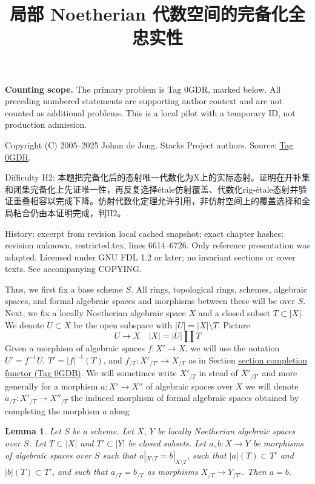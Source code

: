 \documentclass{amsart}
\theoremstyle{plain}
\newtheorem{lemma}[subsection]{Lemma}
\theoremstyle{definition}
\theoremstyle{remark}
\numberwithin{equation}{subsection}
\begin{document}
\title[Stacks Project, Tag 0GDR]{局部 Noetherian 代数空间的完备化全忠实性}
\maketitle
\noindent\textbf{Counting scope.} The primary problem is Tag 0GDR, marked below. All preceding numbered statements are supporting author context and are not counted as additional problems. This is a local pilot with a temporary ID, not production admission.


\noindent Copyright (C) 2005--2025 Johan de Jong. Stacks Project authors. Source: \href{https://stacks.math.columbia.edu/tag/0GDR}{Tag 0GDR}.

\noindent Difficulty H2: 本题把完备化后的态射唯一代数化为X上的实际态射。证明在开补集和闭集完备化上先证唯一性，再反复选择étale仿射覆盖、代数化rig-étale态射并验证重叠相容以完成下降。仿射代数化定理允许引用，非仿射空间上的覆盖选择和全局粘合仍由本证明完成，判H2。.

\noindent History: excerpt from revision local cached snapshot; exact chapter hashes; revision unknown, restricted.tex, lines 6614--6726. Only reference presentation was adapted. Licensed under GNU FDL 1.2 or later; no invariant sections or cover texts. See accompanying COPYING.

\medskip\noindent
Thus, we first fix a base scheme $S$. All rings, topological rings,
schemes, algebraic spaces, and formal algebraic spaces and
morphisms between these will be over $S$. Next, we fix a
locally Noetherian algebraic space $X$ and a closed subset $T \subset |X|$.
We denote $U \subset X$ be the open subspace with $|U| = |X| \setminus T$.
Picture
$$
U \to X \quad |X| = |U| \amalg T
$$
Given a morphism of algebraic spaces $f : X' \to X$, we will use the notation
$U' = f^{-1}U$, $T' = |f|^{-1}(T)$, and $f_{/T} : X'_{/T'} \to X_{/T}$ as in
Section \href{https://stacks.math.columbia.edu/tag/0GDB}{section completion functor (Tag 0GDB)}. We will sometimes write
$X'_{/T}$ in stead of $X'_{/T'}$ and more generally for a morphism
$a : X' \to X''$ of algebraic spaces over $X$ we will denote
$a_{/T} : X'_{/T} \to X''_{/T}$ the induced morphism of formal
algebraic spaces obtained by completing the morphism $a$ along


\begin{lemma}
\label{lemma-faithful}
Let $S$ be a scheme. Let $X$, $Y$ be locally Noetherian algebraic spaces
over $S$. Let $T \subset |X|$ and $T' \subset |Y|$ be closed subsets.
Let $a, b : X \to Y$ be morphisms of algebraic spaces over $S$ such
that $a|_{X \setminus T} = b|_{X \setminus T}$, such that
$|a|(T) \subset T'$ and $|b|(T) \subset T'$, and such that
$a_{/T} = b_{/T}$ as morphisms $X_{/T} \to Y_{/T'}$.
Then $a = b$.
\end{lemma}
\end{document}
